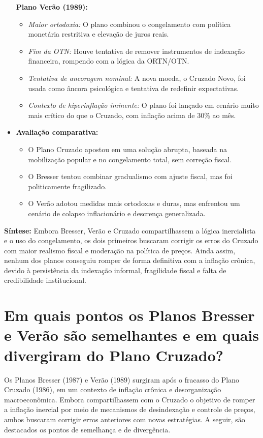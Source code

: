 \documentclass{sciposter}
\begin{document}
\begin{multicols}{3}
\begin{itemize}
    \textbf{Plano Verão (1989):}
    \begin{itemize}
        \item \textit{Maior ortodoxia:} O plano combinou o congelamento com política monetária restritiva e elevação de juros reais.
        \item \textit{Fim da OTN:} Houve tentativa de remover instrumentos de indexação financeira, rompendo com a lógica da ORTN/OTN.
        \item \textit{Tentativa de ancoragem nominal:} A nova moeda, o Cruzado Novo, foi usada como âncora psicológica e tentativa de redefinir expectativas.
        \item \textit{Contexto de hiperinflação iminente:} O plano foi lançado em cenário muito mais crítico do que o Cruzado, com inflação acima de 30\% ao mês.
    \end{itemize}

    \item \textbf{ Avaliação comparativa:}
    \begin{itemize}
        \item O Plano Cruzado apostou em uma solução abrupta, baseada na mobilização popular e no congelamento total, sem correção fiscal.
        \item O Bresser tentou combinar gradualismo com ajuste fiscal, mas foi politicamente fragilizado.
        \item O Verão adotou medidas mais ortodoxas e duras, mas enfrentou um cenário de colapso inflacionário e descrença generalizada.
    \end{itemize}
\end{itemize}

\textbf{Síntese:} Embora Bresser, Verão e Cruzado compartilhassem a lógica inercialista e o uso do congelamento, os dois primeiros buscaram corrigir os erros do Cruzado com maior realismo fiscal e moderação na política de preços. Ainda assim, nenhum dos planos conseguiu romper de forma definitiva com a inflação crônica, devido à persistência da indexação informal, fragilidade fiscal e falta de credibilidade institucional.

\section{\textbf{Em quais pontos os Planos Bresser e Verão são semelhantes e em quais divergiram do Plano Cruzado?}}

Os Planos Bresser (1987) e Verão (1989) surgiram após o fracasso do Plano Cruzado (1986), em um contexto de inflação crônica e desorganização macroeconômica. Embora compartilhassem com o Cruzado o objetivo de romper a inflação inercial por meio de mecanismos de desindexação e controle de preços, ambos buscaram corrigir erros anteriores com novas estratégias. A seguir, são destacados os pontos de semelhança e de divergência.


\end{multicols}
\end{document}
